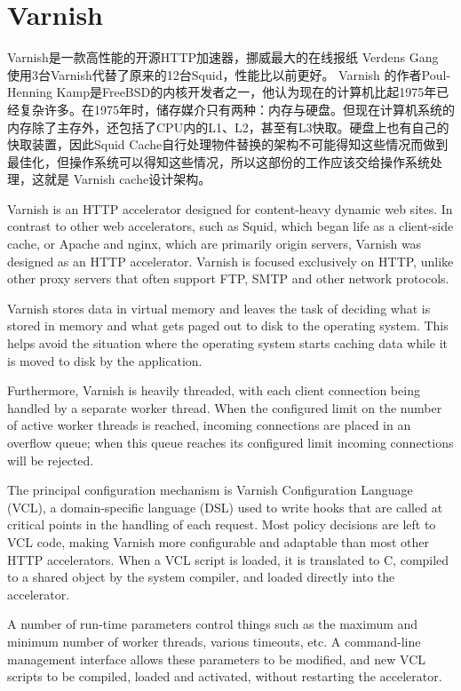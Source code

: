 \section{Varnish}
Varnish是一款高性能的开源HTTP加速器，挪威最大的在线报纸 Verdens Gang 使用3台Varnish代替了原来的12台Squid，性能比以前更好。
Varnish 的作者Poul-Henning Kamp是FreeBSD的内核开发者之一，他认为现在的计算机比起1975年已经复杂许多。在1975年时，储存媒介只有两种：内存与硬盘。但现在计算机系统的内存除了主存外，还包括了CPU内的L1、L2，甚至有L3快取。硬盘上也有自己的快取装置，因此Squid Cache自行处理物件替换的架构不可能得知这些情况而做到最佳化，但操作系统可以得知这些情况，所以这部份的工作应该交给操作系统处理，这就是 Varnish cache设计架构。

Varnish is an HTTP accelerator designed for content-heavy dynamic web sites. In contrast to other web accelerators, such as Squid, which began life as a client-side cache, or Apache and nginx, which are primarily origin servers, Varnish was designed as an HTTP accelerator. Varnish is focused exclusively on HTTP, unlike other proxy servers that often support FTP, SMTP and other network protocols.

Varnish stores data in virtual memory and leaves the task of deciding what is stored in memory and what gets paged out to disk to the operating system. This helps avoid the situation where the operating system starts caching data while it is moved to disk by the application.

Furthermore, Varnish is heavily threaded, with each client connection being handled by a separate worker thread. When the configured limit on the number of active worker threads is reached, incoming connections are placed in an overflow queue; when this queue reaches its configured limit incoming connections will be rejected.

The principal configuration mechanism is Varnish Configuration Language (VCL), a domain-specific language (DSL) used to write hooks that are called at critical points in the handling of each request. Most policy decisions are left to VCL code, making Varnish more configurable and adaptable than most other HTTP accelerators. When a VCL script is loaded, it is translated to C, compiled to a shared object by the system compiler, and loaded directly into the accelerator.

A number of run-time parameters control things such as the maximum and minimum number of worker threads, various timeouts, etc. A command-line management interface allows these parameters to be modified, and new VCL scripts to be compiled, loaded and activated, without restarting the accelerator.

